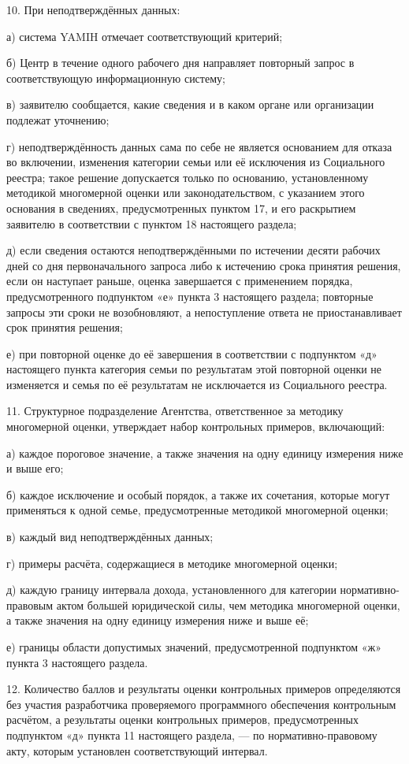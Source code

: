 \documentclass[14pt,a4paper]{extarticle}
\newcommand{\norm}[1]{\par\noindent\hspace*{1.27cm}#1. }
\newcommand{\sub}[1]{\par\noindent\hspace*{1.27cm}#1 }
\begin{document}
\norm{10}При неподтверждённых данных:
\sub{а)}система YAMIH отмечает соответствующий критерий;
\sub{б)}Центр в течение одного рабочего дня направляет повторный запрос в соответствующую информационную систему;
\sub{в)}заявителю сообщается, какие сведения и в каком органе или организации подлежат уточнению;
\sub{г)}неподтверждённость данных сама по себе не является основанием для отказа во включении, изменения категории семьи или её исключения из Социального реестра; такое решение допускается только по основанию, установленному методикой многомерной оценки или законодательством, с указанием этого основания в сведениях, предусмотренных пунктом 17, и его раскрытием заявителю в соответствии с пунктом 18 настоящего раздела;
\sub{д)}если сведения остаются неподтверждёнными по истечении десяти рабочих дней со дня первоначального запроса либо к истечению срока принятия решения, если он наступает раньше, оценка завершается с применением порядка, предусмотренного подпунктом «е» пункта 3 настоящего раздела; повторные запросы эти сроки не возобновляют, а непоступление ответа не приостанавливает срок принятия решения;
\sub{е)}при повторной оценке до её завершения в соответствии с подпунктом «д» настоящего пункта категория семьи по результатам этой повторной оценки не изменяется и семья по её результатам не исключается из Социального реестра.

\norm{11}Структурное подразделение Агентства, ответственное за методику многомерной оценки, утверждает набор контрольных примеров, включающий:
\sub{а)}каждое пороговое значение, а также значения на одну единицу измерения ниже и выше его;
\sub{б)}каждое исключение и особый порядок, а также их сочетания, которые могут применяться к одной семье, предусмотренные методикой многомерной оценки;
\sub{в)}каждый вид неподтверждённых данных;
\sub{г)}примеры расчёта, содержащиеся в методике многомерной оценки;
\sub{д)}каждую границу интервала дохода, установленного для категории нормативно-правовым актом большей юридической силы, чем методика многомерной оценки, а также значения на одну единицу измерения ниже и выше её;
\sub{е)}границы области допустимых значений, предусмотренной подпунктом «ж» пункта 3 настоящего раздела.

\norm{12}Количество баллов и результаты оценки контрольных примеров определяются без участия разработчика проверяемого программного обеспечения контрольным расчётом, а результаты оценки контрольных примеров, предусмотренных подпунктом «д» пункта 11 настоящего раздела, — по нормативно-правовому акту, которым установлен соответствующий интервал.
\end{document}
